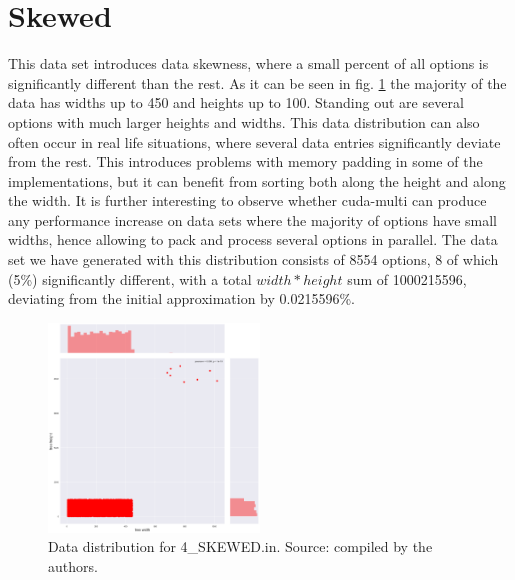 \section{Skewed}
This data set introduces data skewness, where a small percent of all options is significantly different than the rest. As it can be seen in fig. \ref{fig:data:skewed} the majority of the data has widths up to 450 and heights up to 100. Standing out are several options with much larger heights and widths. This data distribution can also often occur in real life situations, where several data entries significantly deviate from the rest. This introduces problems with memory padding in some of the implementations, but it can benefit from sorting both along the height and along the width. It is further interesting to observe whether cuda-multi can produce any performance increase on data sets where the majority of options have small widths, hence allowing to pack and process several options in parallel. The data set we have generated with this distribution consists of 8554 options, 8 of which (5\%) significantly different, with a total $width*height$ sum of 1000215596, deviating from the initial approximation by 0.0215596\%.

\begin{figure}[H]
	\centering
	\includegraphics[width=0.5\textwidth]{img/4_SKEWED_plot.png}
	\caption{Data distribution for 4\_SKEWED.in. Source: compiled by the authors.}
	\label{fig:data:skewed}
\end{figure}

